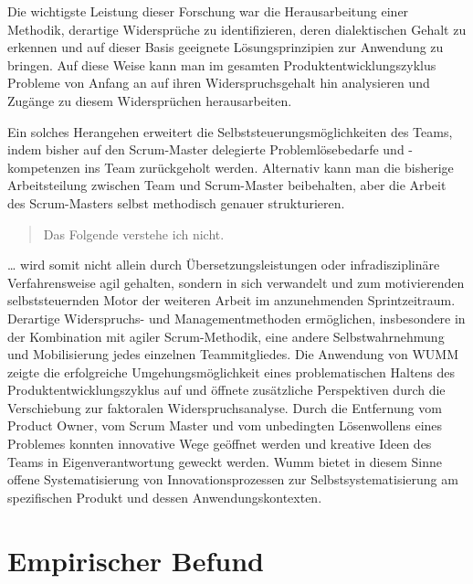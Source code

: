 \documentclass[a4paper,11pt]{article}
\begin{document}
Die wichtigste Leistung dieser Forschung war die Herausarbeitung einer
Methodik, derartige Widersprüche zu identifizieren, deren dialektischen Gehalt
zu erkennen und auf dieser Basis geeignete Lösungsprinzipien zur Anwendung zu
bringen. Auf diese Weise kann man im gesamten Produktentwicklungszyklus
Probleme von Anfang an auf ihren Widerspruchsgehalt hin  analysieren und
Zugänge zu diesem Widersprüchen herausarbeiten.

Ein solches Herangehen erweitert die Selbststeuerungsmöglichkeiten des Teams,
indem bisher auf den Scrum-Master delegierte Problemlösebedarfe und
-kompetenzen ins Team zurückgeholt werden. Alternativ kann man die bisherige
Arbeitsteilung zwischen Team und Scrum-Master beibehalten, aber die Arbeit des
Scrum-Masters selbst methodisch genauer strukturieren.

\begin{quote}
  Das Folgende verstehe ich nicht.
\end{quote}
… wird somit nicht allein durch Übersetzungsleistungen oder infradisziplinäre
Verfahrensweise agil gehalten, sondern in sich verwandelt und zum
motivierenden selbststeuernden Motor der weiteren Arbeit im anzunehmenden
Sprintzeitraum. Derartige Widerspruchs- und Managementmethoden ermöglichen,
insbesondere in der Kombination mit agiler Scrum-Methodik, eine andere
Selbstwahrnehmung und Mobilisierung jedes einzelnen Teammitgliedes. Die
Anwendung von WUMM zeigte die erfolgreiche Umgehungsmöglichkeit eines
problematischen Haltens des Produktentwicklungszyklus auf und öffnete
zusätzliche Perspektiven durch die Verschiebung zur faktoralen
Widerspruchsanalyse. Durch die Entfernung vom Product Owner, vom Scrum Master
und vom unbedingten Lösenwollens eines Problemes konnten innovative Wege
geöffnet werden und kreative Ideen des Teams in Eigenverantwortung geweckt
werden. Wumm bietet in diesem Sinne offene Systematisierung von
Innovationsprozessen zur Selbstsystematisierung am spezifischen Produkt und
dessen Anwendungskontexten.

\section*{Empirischer Befund}
\end{document}

